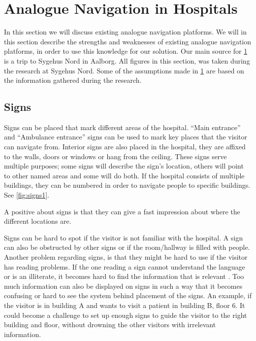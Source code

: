 \section{Analogue Navigation in Hospitals} %
\label{sec:anal_nav}
In this section we will discuss existing analogue navigation platforms. We will in this section describe the strengths and weaknesses of existing analogue navigation platforms, in order to use this knowledge for our solution. Our main source for \cref{sec:anal_nav} is a trip to Sygehus Nord in Aalborg. All figures in this section, was taken during the research at Sygehus Nord. Some of the assumptions made in \cref{sec:anal_nav} are based on the information gathered during the research. 

\subsection{Signs} \label{sub:sign}
Signs can be placed that mark different areas of the hospital. \enquote{Main entrance} and \enquote{Ambulance entrance}\cite{signs_hospital} signs can be used to mark key places that the visitor can navigate from\cite{art_Osborne}.
Interior signs are also placed in the hospital, they are affixed to the walls, doors or windows or hang from the ceiling. These signs serve multiple purposes; some signs will describe the sign's location, others will point to other named areas and some will do both. 
If the hospital consists of multiple buildings, they can be numbered in order to navigate people to specific buildings. See \cref{fig:signs1}.

A positive about signs is that they can give a fast impression about where the different locations are.

Signs can be hard to spot if the visitor is not familiar with the hospital. A sign can also be obstructed by other signs or if the room/hallway is filled with people. Another problem regarding signs, is that they might be hard to use if the visitor has reading problems. If the one reading a sign cannot understand the language or is an illiterate, it becomes hard to find the information that is relevant \cite{signs_reading}. Too much information can also be displayed on signs in such a way that it becomes confusing or hard to see the system behind placement of the signs.
An example, if the visitor is in building A and wants to visit a patient in building B, floor 6. It could become a challenge to set up enough signs to guide the visitor to the right building and floor, without drowning the other visitors with irrelevant information.


